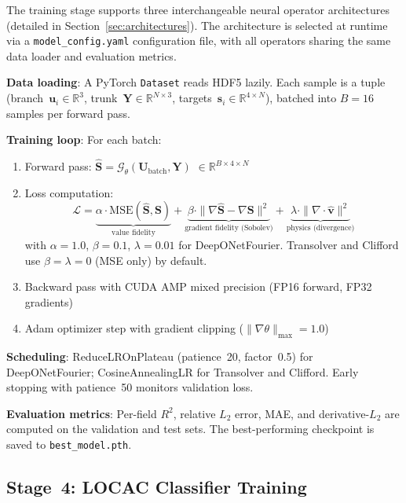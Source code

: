 \documentclass[conference]{IEEEtran}
\begin{document}
The training stage supports three interchangeable neural operator architectures (detailed in Section~\ref{sec:architectures}). The architecture is selected at runtime via a \texttt{model\_config.yaml} configuration file, with all operators sharing the same data loader and evaluation metrics.

\textbf{Data loading}: A PyTorch \texttt{Dataset} reads HDF5 lazily. Each sample is a tuple (branch~$\bm{u}_i \in \mathbb{R}^3$, trunk~$\bm{Y} \in \mathbb{R}^{N \times 3}$, targets~$\bm{s}_i \in \mathbb{R}^{4 \times N}$), batched into $B = 16$ samples per forward pass.

\textbf{Training loop}: For each batch:
\begin{enumerate}
    \item Forward pass: $\hat{\bm{S}} = \mathcal{G}_\theta(\bm{U}_\text{batch}, \bm{Y})$ $\in \mathbb{R}^{B \times 4 \times N}$
    \item Loss computation:
    \begin{equation}
    \mathcal{L} = \underbrace{\alpha \cdot \text{MSE}(\hat{\bm{S}}, \bm{S})}_{\text{value fidelity}} + \underbrace{\beta \cdot \|\nabla\hat{\bm{S}} - \nabla\bm{S}\|^2}_{\text{gradient fidelity (Sobolev)}} + \underbrace{\lambda \cdot \|{\nabla \!\cdot\! \hat{\bm{v}}}\|^2}_{\text{physics (divergence)}}
    \label{eq:total_loss}
    \end{equation}
    with $\alpha = 1.0$, $\beta = 0.1$, $\lambda = 0.01$ for DeepONetFourier. Transolver and Clifford use $\beta = \lambda = 0$ (MSE only) by default.
    \item Backward pass with CUDA AMP mixed precision (FP16 forward, FP32 gradients)
    \item Adam optimizer step with gradient clipping ($\|\nabla\theta\|_\text{max} = 1.0$)
\end{enumerate}

\textbf{Scheduling}: ReduceLROnPlateau (patience~20, factor~0.5) for DeepONetFourier; CosineAnnealingLR for Transolver and Clifford. Early stopping with patience~50 monitors validation loss.

\textbf{Evaluation metrics}: Per-field $R^2$, relative $L_2$ error, MAE, and derivative-$L_2$ are computed on the validation and test sets. The best-performing checkpoint is saved to \texttt{best\_model.pth}.

\subsection{Stage~4: LOCAC Classifier Training}
\end{document}
